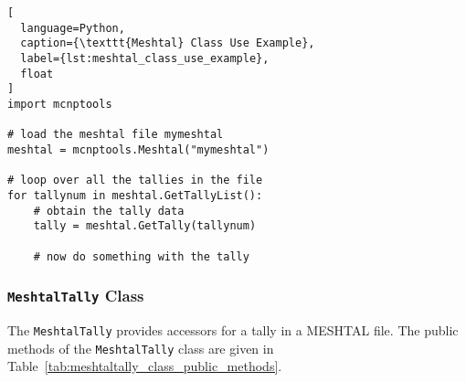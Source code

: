 \documentclass[11pt]{article}
\begin{document}
\begin{lstlisting}[
  language=Python,
  caption={\texttt{Meshtal} Class Use Example},
  label={lst:meshtal_class_use_example},
  float
]
import mcnptools

# load the meshtal file mymeshtal
meshtal = mcnptools.Meshtal("mymeshtal")

# loop over all the tallies in the file
for tallynum in meshtal.GetTallyList():
    # obtain the tally data
    tally = meshtal.GetTally(tallynum)

    # now do something with the tally
\end{lstlisting}

\subsubsection{\texttt{MeshtalTally} Class}\label{the-meshtaltally-class}

The \texttt{MeshtalTally} provides accessors for a tally in a MESHTAL
file. The public methods of the \texttt{MeshtalTally} class are given in
Table~\ref{tab:meshtaltally_class_public_methods}.
\end{document}
